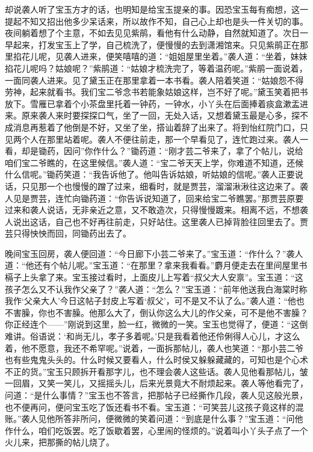 \begin{parag}
    却说袭人听了宝玉方才的话，也明知是给宝玉提亲的事。因恐宝玉每有痴想，这一提起不知又招出他多少呆话来，所以故作不知，自己心上却也是头一件关切的事。夜间躺着想了个主意，不如去见见紫鹃，看他有什么动静，自然就知道了。次日一早起来，打发宝玉上了学，自己梳洗了，便慢慢的去到潇湘馆来。只见紫鹃正在那里掐花儿呢，见袭人进来，便笑嘻嘻的道：“姐姐屋里坐着。”袭人道：“坐着，妹妹掐花儿呢吗？姑娘呢？”紫鹃道：“姑娘才梳洗完了，等着温药呢。”紫鹃一面说着，一面同袭人进来。见了黛玉正在那里拿着一本书看。袭人陪着笑道：“姑娘怨不得劳神，起来就看书。我们宝二爷念书若能象姑娘这样，岂不好了呢。”黛玉笑着把书放下。雪雁已拿着个小茶盘里托着一钟药，一钟水，小丫头在后面捧着痰盒漱盂进来。原来袭人来时要探探口气，坐了一回，无处入话，又想着黛玉最是心多，探不成消息再惹着了他倒是不好，又坐了坐，搭讪着辞了出来了。将到怡红院门口，只见两个人在那里站着呢。袭人不便往前走，那一个早看见了，连忙跑过来。袭人一看，却是锄药，因问”你作什么？”锄药道：“刚才芸二爷来了，拿了个帖儿，说给咱们宝二爷瞧的，在这里候信。”袭人道：“宝二爷天天上学，你难道不知道，还候什么信呢。”锄药笑道：“我告诉他了。他叫告诉姑娘，听姑娘的信呢。”袭人正要说话，只见那一个也慢慢的蹭了过来，细看时，就是贾芸，溜溜湫湫往这边来了。袭人见是贾芸，连忙向锄药道：“你告诉说知道了，回来给宝二爷瞧罢。”那贾芸原要过来和袭人说话，无非亲近之意，又不敢造次，只得慢慢踱来。相离不远，不想袭人说出这话，自己也不好再往前走，只好站住。这里袭人已掉背脸往回里去了。贾芸只得怏怏而回，同锄药出去了。
\end{parag}


\begin{parag}
    晚间宝玉回房，袭人便回道：“今日廊下小芸二爷来了。”宝玉道：“作什么？”袭人道：“他还有个帖儿呢。”宝玉道：“在那里？拿来我看看。”麝月便走去在里间屋里书槅子上头拿了来。宝玉接过看时，上面皮儿上写着“叔父大人安禀”。宝玉道：“这孩子怎么又不认我作父亲了？”袭人道：“怎么？”宝玉道：“前年他送我白海棠时称我作‘父亲大人’今日这帖子封皮上写着‘叔父’，可不是又不认了么。”袭人道：“他也不害臊，你也不害臊。他那么大了，倒认你这么大儿的作父亲，可不是他不害臊？你正经连个——”刚说到这里，脸一红，微微的一笑。宝玉也觉得了，便道：“这倒难讲。俗语说：‘和尚无儿，孝子多着呢。’只是我看着他还伶俐得人心儿，才这么着，他不愿意，我还不希罕呢。”说着，一面拆那帖儿，袭人也笑道：“那小芸二爷也有些鬼鬼头头的。什么时候又要看人，什么时侯又躲躲藏藏的，可知也是个心术不正的货。”宝玉只顾拆开看那字儿，也不理会袭人这些话。袭人见他看那帖儿，皱一回眉，又笑一笑儿，又摇摇头儿，后来光景竟大不耐烦起来。袭人等他看完了，问道：“是什么事情？”宝玉也不答言，把那帖子已经撕作几段，袭人见这般光景，也不便再问，便问宝玉吃了饭还看书不看。宝玉道：“可笑芸儿这孩子竟这样的混账。”袭人见他所答非所问，便微微的笑着问道：“到底是什么事？”宝玉道：“问他作什么，咱们吃饭罢。吃了饭歇着罢，心里闹的怪烦的。”说着叫小丫头子点了一个火儿来，把那撕的帖儿烧了。
\end{parag}


